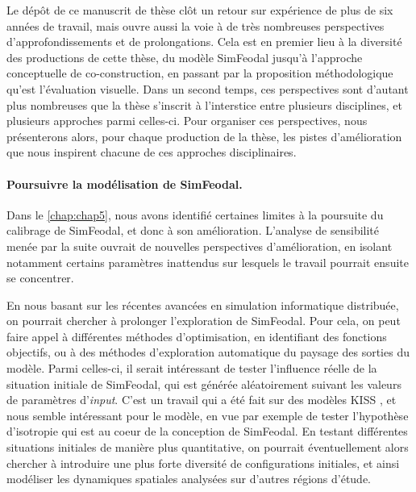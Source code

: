 Le dépôt de ce manuscrit de thèse clôt un retour sur expérience de plus de six années de travail, mais ouvre aussi la voie à de très nombreuses perspectives d'approfondissements et de prolongations.
Cela est en premier lieu à la diversité des \og productions\fg{} de cette thèse, du modèle SimFeodal jusqu'à l'approche conceptuelle de co-construction, en passant par la proposition méthodologique qu'est l'évaluation visuelle.
Dans un second temps, ces perspectives sont d'autant plus nombreuses que la thèse s'inscrit à l'interstice entre plusieurs disciplines, et plusieurs approches parmi celles-ci.
Pour organiser ces perspectives, nous présenterons alors, pour chaque \og production\fg{} de la thèse, les pistes d'amélioration que nous inspirent chacune de ces approches disciplinaires.

\paragraph{Poursuivre la modélisation de SimFeodal.}

Dans le \cref{chap:chap5}, nous avons identifié certaines limites à la poursuite du calibrage de SimFeodal, et donc à son amélioration.
L'analyse de sensibilité menée par la suite ouvrait de nouvelles perspectives d'amélioration, en isolant notamment certains paramètres inattendus sur lesquels le travail pourrait ensuite se concentrer.

En nous basant sur les récentes avancées en simulation informatique distribuée, on pourrait chercher à prolonger l'exploration de SimFeodal.
Pour cela, on peut faire appel à différentes méthodes d'optimisation, en identifiant des \og fonctions objectifs\fg{}, ou à des méthodes d'exploration automatique du paysage des sorties du modèle.
Parmi celles-ci, il serait intéressant de tester l'influence réelle de la situation initiale de SimFeodal, qui est générée aléatoirement suivant les valeurs de paramètres d'\textit{input}.
C'est un travail qui a été fait sur des modèles KISS \autocite{raimbault_space_2019}, et nous semble intéressant pour le modèle, en vue par exemple de tester l'hypothèse d'isotropie qui est au coeur de la conception de SimFeodal.
En testant différentes situations initiales de manière plus quantitative, on pourrait éventuellement alors chercher à introduire une plus forte diversité de configurations initiales, et ainsi modéliser les dynamiques spatiales analysées sur d'autres régions d'étude.

